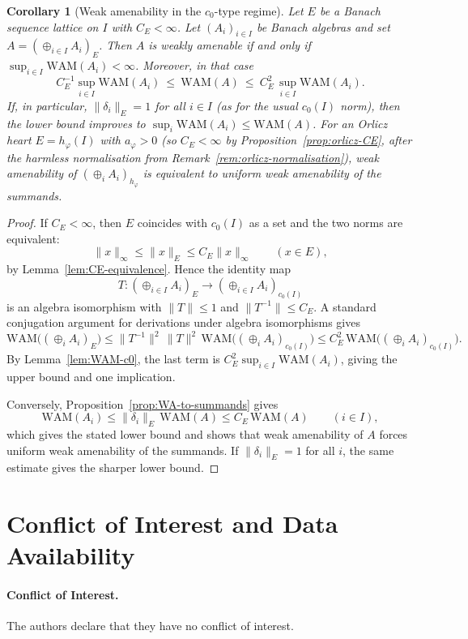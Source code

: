 \documentclass[reqno]{amsart}
\theoremstyle{plain}
\newtheorem{corollary}[theorem]{Corollary}
\theoremstyle{definition}
\theoremstyle{remark}
\renewcommand{\le}{\leqslant}
\newcommand{\WAM}{\mathrm{WAM}}  %
\begin{document}
\begin{corollary}[Weak amenability in the $c_0$-type regime]\label{cor:WAM-CE}
Let $E$ be a Banach sequence lattice on $I$ with $C_E<\infty$.
Let $(A_i)_{i\in I}$ be Banach algebras and set $A=(\oplus_{i\in I}A_i)_E$.
Then $A$ is weakly amenable if and only if $\sup_{i\in I}\WAM(A_i)<\infty$.
Moreover, in that case
\[
C_E^{-1}\sup_{i\in I}\WAM(A_i)\ \le\ \WAM(A)\ \le\ C_E^2\,\sup_{i\in I}\WAM(A_i).
\]
If, in particular, $\|\delta_i\|_E=1$ for all $i\in I$ (as for the usual $c_0(I)$ norm), then the lower
bound improves to $\sup_i\WAM(A_i)\le\WAM(A)$.
For an Orlicz heart $E=h_\varphi(I)$ with $a_\varphi>0$ (so $C_E<\infty$ by Proposition~\ref{prop:orlicz-CE}, after the harmless normalisation from Remark~\ref{rem:orlicz-normalisation}),
weak amenability of $(\oplus_i A_i)_{h_\varphi}$ is equivalent to uniform weak amenability of the summands.
\end{corollary}

\begin{proof}
If $C_E<\infty$, then $E$ coincides with $c_0(I)$ as a set and the two norms are equivalent:
\[
\|x\|_\infty \le \|x\|_E \le C_E\|x\|_\infty \qquad (x\in E),
\]
by Lemma~\ref{lem:CE-equivalence}. Hence the identity map
\[
T\colon (\oplus_{i\in I}A_i)_E \longrightarrow (\oplus_{i\in I}A_i)_{c_0(I)}
\]
is an algebra isomorphism with $\|T\|\le 1$ and $\|T^{-1}\|\le C_E$.
A standard conjugation argument for derivations under algebra isomorphisms gives
\[
\WAM\bigl((\oplus_i A_i)_E\bigr)
\le \|T^{-1}\|^2\,\|T\|^2\,\WAM\bigl((\oplus_i A_i)_{c_0(I)}\bigr)
\le C_E^2\,\WAM\bigl((\oplus_i A_i)_{c_0(I)}\bigr).
\]
By Lemma~\ref{lem:WAM-c0}, the last term is
$C_E^2\sup_{i\in I}\WAM(A_i)$, giving the upper bound and one implication.

Conversely, Proposition~\ref{prop:WA-to-summands} gives
\[
\WAM(A_i)\le \|\delta_i\|_E\,\WAM(A)\le C_E\,\WAM(A)\qquad(i\in I),
\]
which gives the stated lower bound and shows that weak amenability of $A$ forces uniform weak amenability of the summands.
If $\|\delta_i\|_E=1$ for all $i$, the same estimate gives the sharper lower bound.
\end{proof}
\section*{Conflict of Interest and Data Availability}

\paragraph{Conflict of Interest.}
The authors declare that they have no conflict of interest.
\end{document}
